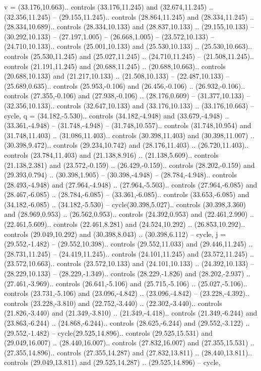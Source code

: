 {v} = {(33.176,10.663).. controls (33.176,11.245) and (32.674,11.245) .. (32.356,11.245) -- (29.155,11.245).. controls (28.864,11.245) and (28.334,11.245) .. (28.334,10.689).. controls (28.334,10.133) and (28.837,10.133) .. (29.155,10.133) -- (30.292,10.133) -- (27.197,1.005) -- (26.668,1.005) -- (23.572,10.133) -- (24.710,10.133).. controls (25.001,10.133) and (25.530,10.133) .. (25.530,10.663).. controls (25.530,11.245) and (25.027,11.245) .. (24.710,11.245) -- (21.508,11.245).. controls (21.191,11.245) and (20.688,11.245) .. (20.688,10.663).. controls (20.688,10.133) and (21.217,10.133) .. (21.508,10.133) -- (22.487,10.133) -- (25.689,0.635).. controls (25.953,-0.106) and (26.456,-0.106) .. (26.932,-0.106).. controls (27.355,-0.106) and (27.938,-0.106) .. (28.176,0.609) -- (31.377,10.133) -- (32.356,10.133).. controls (32.647,10.133) and (33.176,10.133) .. (33.176,10.663) -- cycle},
{q} = {(34.182,-5.530).. controls (34.182,-4.948) and (33.679,-4.948) .. (33.361,-4.948) -- (31.748,-4.948) -- (31.748,10.557).. controls (31.748,10.954) and (31.748,11.403) .. (31.086,11.403).. controls (30.398,11.403) and (30.398,11.007) .. (30.398,9.472).. controls (29.234,10.742) and (28.176,11.403) .. (26.720,11.403).. controls (23.784,11.403) and (21.138,8.916) .. (21.138,5.609).. controls (21.138,2.381) and (23.572,-0.159) .. (26.429,-0.159).. controls (28.202,-0.159) and (29.393,0.794) .. (30.398,1.905) -- (30.398,-4.948) -- (28.784,-4.948).. controls (28.493,-4.948) and (27.964,-4.948) .. (27.964,-5.503).. controls (27.964,-6.085) and (28.467,-6.085) .. (28.784,-6.085) -- (33.361,-6.085).. controls (33.653,-6.085) and (34.182,-6.085) .. (34.182,-5.530) -- cycle(30.398,5.027).. controls (30.398,3.360) and (28.969,0.953) .. (26.562,0.953).. controls (24.392,0.953) and (22.461,2.990) .. (22.461,5.609).. controls (22.461,8.281) and (24.524,10.292) .. (26.853,10.292).. controls (29.049,10.292) and (30.398,8.043) .. (30.398,6.112) -- cycle},
{j} = {(29.552,-1.482) -- (29.552,10.398).. controls (29.552,11.033) and (29.446,11.245) .. (28.731,11.245) -- (24.419,11.245).. controls (24.101,11.245) and (23.572,11.245) .. (23.572,10.663).. controls (23.572,10.133) and (24.101,10.133) .. (24.392,10.133) -- (28.229,10.133) -- (28.229,-1.349).. controls (28.229,-1.826) and (28.202,-2.937) .. (27.461,-3.969).. controls (26.641,-5.106) and (25.715,-5.106) .. (25.027,-5.106).. controls (23.731,-5.106) and (23.096,-4.842) .. (23.096,-4.842) -- (23.228,-4.392).. controls (23.228,-3.810) and (22.752,-3.440) .. (22.302,-3.440).. controls (21.826,-3.440) and (21.349,-3.810) .. (21.349,-4.418).. controls (21.349,-6.244) and (23.863,-6.244) .. (24.868,-6.244).. controls (28.625,-6.244) and (29.552,-3.122) .. (29.552,-1.482) -- cycle(29.525,14.896).. controls (29.525,15.531) and (29.049,16.007) .. (28.440,16.007).. controls (27.832,16.007) and (27.355,15.531) .. (27.355,14.896).. controls (27.355,14.287) and (27.832,13.811) .. (28.440,13.811).. controls (29.049,13.811) and (29.525,14.287) .. (29.525,14.896) -- cycle},
